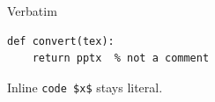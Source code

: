 \documentclass[aspectratio=43]{beamer}
\begin{document}


\begin{frame}[fragile]{Verbatim}
  \begin{verbatim}
def convert(tex):
    return pptx  % not a comment
  \end{verbatim}
  Inline \verb|code $x$| stays literal.
\end{frame}
\end{document}
